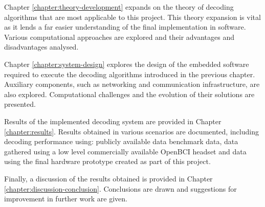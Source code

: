 Chapter \ref{chapter:theory-development} expands on the theory of decoding algorithms that are most applicable to this project. This theory expansion is vital as it lends a far easier understanding of the final implementation in software. Various computational approaches are explored and their advantages and disadvantages analysed. 

Chapter \ref{chapter:system-design} explores the design of the embedded software required to execute the decoding algorithms introduced in the previous chapter. Auxiliary components, such as networking and communication infrastructure, are also explored. Computational challenges and the evolution of their solutions are presented. 

Results of the implemented decoding system are provided in Chapter \ref{chapter:results}. Results obtained in various scenarios are documented, including decoding performance using: publicly available data benchmark data, data gathered using a low level commercially available OpenBCI headset and data using the final hardware prototype created as part of this project. 

Finally, a discussion of the results obtained is provided in Chapter \ref{chapter:discussion-conclusion}. Conclusions are drawn and suggestions for improvement in further work are given. 